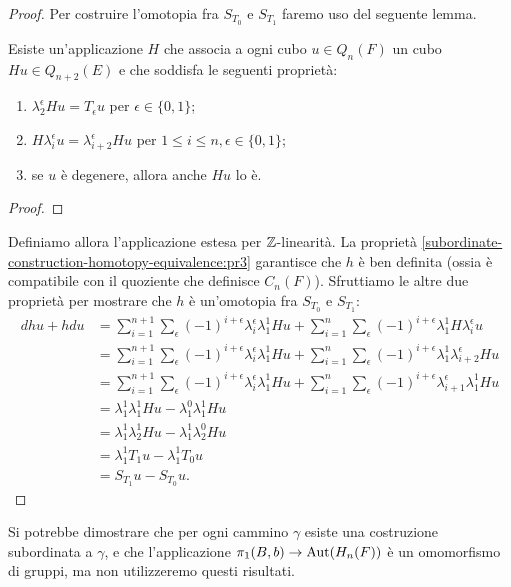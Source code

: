 \begin{proof}
Per costruire l'omotopia fra $S_{T_0}$ e $S_{T_1}$ faremo uso del seguente lemma.
\begin{lemma}
Esiste un'applicazione $H$ che associa a ogni cubo $u\in Q_n(F)$ un cubo $Hu\in Q_{n+2}(E)$ e che soddisfa le seguenti proprietà:
\begin{enumerate}
\item\label{subordinate-construction-homotopy-equivalence:pr1} $\lambda^\epsilon_2Hu=T_\epsilon u$ per $\epsilon\in\{0,1\}$;
\item\label{subordinate-construction-homotopy-equivalence:pr2} $H\lambda^\epsilon_iu=\lambda^\epsilon_{i+2}Hu$ per $1\le i\le n,\epsilon\in\{0,1\}$;
\item\label{subordinate-construction-homotopy-equivalence:pr3} se $u$ è degenere, allora anche $Hu$ lo è.
\end{enumerate}
\end{lemma}
\begin{proof}

\end{proof}
Definiamo allora l'applicazione
estesa per $\mathbb{Z}$-linearità. La proprietà \ref{subordinate-construction-homotopy-equivalence:pr3} garantisce che $h$ è ben definita (ossia è compatibile con il quoziente che definisce $C_n(F)$). Sfruttiamo le altre due proprietà per mostrare che $h$ è un'omotopia fra $S_{T_0}$ e $S_{T_1}$:
\begin{align*}
dhu+hdu&=\sum_{i=1}^{n+1}\sum_\epsilon(-1)^{i+\epsilon}\lambda^\epsilon_i\lambda^1_1Hu+\sum_{i=1}^n\sum_\epsilon(-1)^{i+\epsilon}\lambda^1_1H\lambda^\epsilon_iu\\
&=\sum_{i=1}^{n+1}\sum_\epsilon(-1)^{i+\epsilon}\lambda^\epsilon_i\lambda^1_1Hu+\sum_{i=1}^n\sum_\epsilon(-1)^{i+\epsilon}\lambda^1_1\lambda^\epsilon_{i+2}Hu\\
&=\sum_{i=1}^{n+1}\sum_\epsilon(-1)^{i+\epsilon}\lambda^\epsilon_i\lambda^1_1Hu+\sum_{i=1}^n\sum_\epsilon(-1)^{i+\epsilon}\lambda^\epsilon_{i+1}\lambda^1_1Hu\\
&=\lambda^1_1\lambda^1_1Hu-\lambda^0_1\lambda^1_1Hu\\
&=\lambda^1_1\lambda^1_2Hu-\lambda^1_1\lambda^0_2Hu\\
&=\lambda^1_1T_1u-\lambda^1_1T_0u\\
&=S_{T_1}u-S_{T_0}u.
\end{align*}
\end{proof}
Si potrebbe dimostrare che per ogni cammino $\gamma$ esiste una costruzione subordinata a $\gamma$, e che l'applicazione $\pi_1(B,b)\to\operatorname{Aut}(H_n(F))$ è un omomorfismo di gruppi, ma non utilizzeremo questi risultati.
